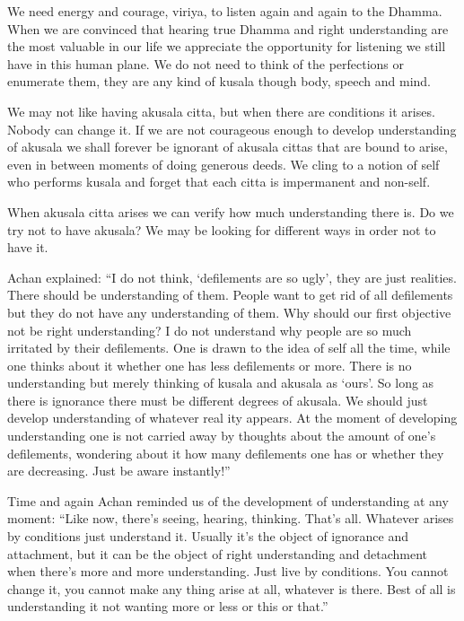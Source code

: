 We need energy and courage, viriya, to listen again and again to the Dhamma. When 
we are convinced that hearing true Dhamma and right understanding are the most 
valuable in our life we appreciate the opportunity for listening we still have in this 
human plane. We do not need to think of the perfections or enumerate them, they are 
any kind of kusala though body, speech and mind. 

We may not like having akusala citta, but when there are conditions it arises. Nobody 
can change it. If we are not courageous enough to develop understanding of akusala 
we shall forever be ignorant of akusala cittas that are bound to arise, even in between 
moments of doing generous deeds. We cling to a notion of self who performs kusala 
and forget that each citta is impermanent and non-self. 

When akusala citta arises we can verify how much understanding there is. Do we try 
not to have akusala? We may be looking for different ways in order not to have it. 

 Achan explained: ``I do not think, ‘defilements are so ugly’, they are just realities. 
There should be understanding of them. People want to get rid of all defilements but 
they do not have any understanding of them. Why should our first objective not be 
right understanding? I do not understand why people are so much irritated by their 
defilements. One is drawn to the idea of self all the time, while one thinks about it 
whether one has less defilements or more. There is no understanding but merely 
thinking of kusala and akusala as ‘ours'. So long as there is ignorance there must be 
different degrees of akusala. We should just develop understanding of whatever real 
ity appears. At the moment of developing understanding one is not carried away by 
thoughts about the amount of one's defilements, wondering about it how many defilements one has or whether they are decreasing. Just be aware instantly!''

Time and again  Achan reminded us of the development of understanding at any moment: ``Like now, there's seeing, hearing, thinking. That's all. Whatever arises by conditions just understand it. Usually it's the object of ignorance and attachment, but it 
can be the object of right understanding and detachment when there's more and more 
understanding. Just live by conditions. You cannot change it, you cannot make any 
thing arise at all, whatever is there. Best of all is understanding it not wanting more 
or less or this or that.'' 

